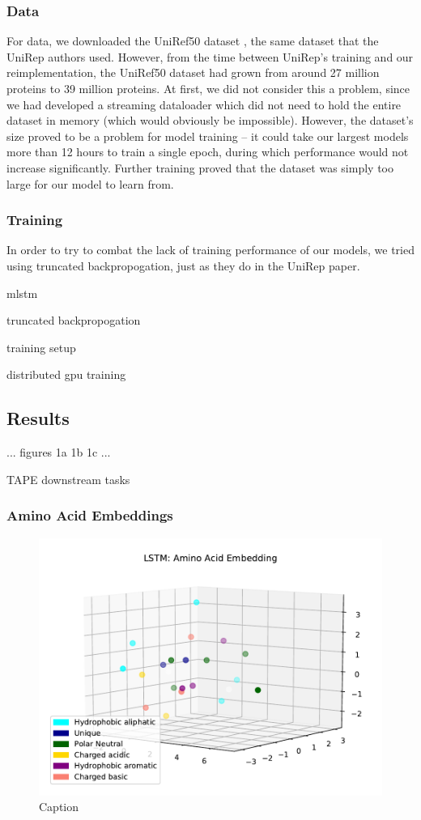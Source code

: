 \documentclass[a4paper,12pt]{article}
\begin{document}
\subsubsection{Data}
For data, we downloaded the UniRef50 dataset \cite{uniprot}, the same dataset that the UniRep authors used. However, from the time between UniRep's training and our reimplementation, the UniRef50 dataset had grown from around 27 million proteins to 39 million proteins. At first, we did not consider this a problem, since we had developed a streaming dataloader which did not need to hold the entire dataset in memory (which would obviously be impossible). However, the dataset's size proved to be a problem for model training -- it could take our largest models more than 12 hours to train a single epoch, during which performance would not increase significantly. Further training proved that the dataset was simply too large for our model to learn from.

\subsubsection{Training}
In order to try to combat the lack of training performance of our models, we tried using truncated backpropogation, just as they do in the UniRep paper.

mlstm

truncated backpropogation

training setup

distributed gpu training

\subsection{Results}
... figures 1a 1b 1c ...

TAPE downstream tasks

\subsubsection{Amino Acid Embeddings}

\begin{figure}
    \centering
    \includegraphics{figures/fig2a_LSTM.pdf}
    \caption{Caption}
    \label{fig:fig2a_LSTM}
\end{figure}
\end{document}

